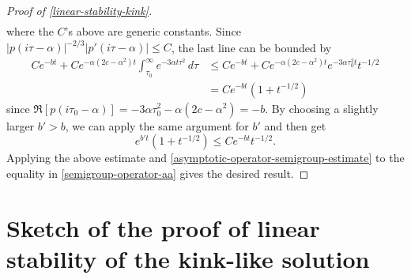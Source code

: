 \begin{proof}[Proof of \cref{linear-stability-kink}]
\begin{equation}
\begin{aligned}
		\end{aligned}
	\end{equation}
	where the \(C\)'s above are generic constants. Since \(|p(i\tau-\alpha)|^{-2/3} |p'(i\tau - \alpha)|\leq C\), the last line can be bounded by 
	\begin{equation}
		\begin{aligned}
			C e^{-bt} + C e^{-\alpha(2c - \alpha^2) t} \int_{\tau_0}^\infty e^{-3\alpha t \tau^2}\, d\tau &\leq C e^{-bt} + C e^{-\alpha(2c - \alpha^2) t} e^{-3\alpha \tau_0^2 t} t^{-1/2} \\
			&= C e^{-bt }( 1 + t^{-1/2})
		\end{aligned}
	\end{equation}
	since \(\Re [p(i\tau_0 - \alpha)] = -3\alpha \tau_0^2 - \alpha (2c - \alpha^2) = -b\). By choosing a slightly larger \(b' > b\), we can apply the same argument for \(b'\) and then get
	\begin{equation}
		e^{b't} ( 1 + t^{-1/2}) \leq C e^{-bt} t^{-1/2}.
	\end{equation}
	Applying the above estimate and \cref{asymptotic-operator-semigroup-estimate} to the equality in \cref{semigroup-operator-aa} gives the desired result.
\end{proof}

\section{Sketch of the proof of linear stability of the kink-like solution}

